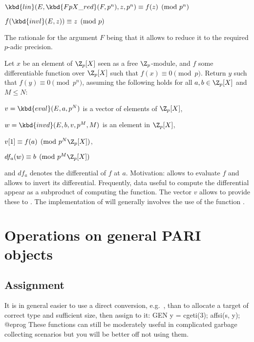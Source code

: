 \item $\kbd{lin}(E, \kbd{FpX\_red}(F, p^n), z, p^n) \equiv f(z) \pmod{p^n}$

\item $f(\kbd{invl}(E, z)) \equiv z \pmod{p}$

The rationale for the argument $F$ being that it allows 
to reduce it to the required $p$-adic precision.


Let $x$ be an element of $\Z_p[X]$ seen as a free  $\Z_p$-module, and $f$
some differentiable function over $\Z_p[X]$ such that $f(x) \equiv 0
\pmod{p}$. Return $y$ such that $f(y) \equiv 0\pmod{p^n}$, assuming the
following holds for all $a, b\in \Z_p[X]$ and $M\leq N$:

\item $v = \kbd{eval}(E,a,p^N)$ is a vector of elements of $\Z_p[X]$,

\item $w = \kbd{invd}(E,b,v,p^M,M)$ is an element in $\Z_p[X]$,

\item $v[1] \equiv f(a) \pmod{p^N\Z_p[X]}$,

\item $df_a(w) \equiv b \pmod{p^M\Z_p[X]}$

\noindent and $df_a$ denotes the differential of $f$ at $a$. Motivation:
 allows to evaluate $f$ and  allows to invert its
differential. Frequently, data useful to compute the differential appear as a
subproduct of computing the function. The vector $v$ allows  to
provide these to . The implementation of  will generally
involves the use of the function .


\newpage
\chapter{Operations on general PARI objects}

\section{Assignment}

It is in general easier to use a direct conversion,
e.g.~, than to allocate a target of correct type and
sufficient size, then assign to it:
\bprog
  GEN y = cgeti(3); affsi(s, y);
@eprog\noindent
These functions can still be moderately useful in complicated garbage
collecting scenarios but you will be better off not using them.

